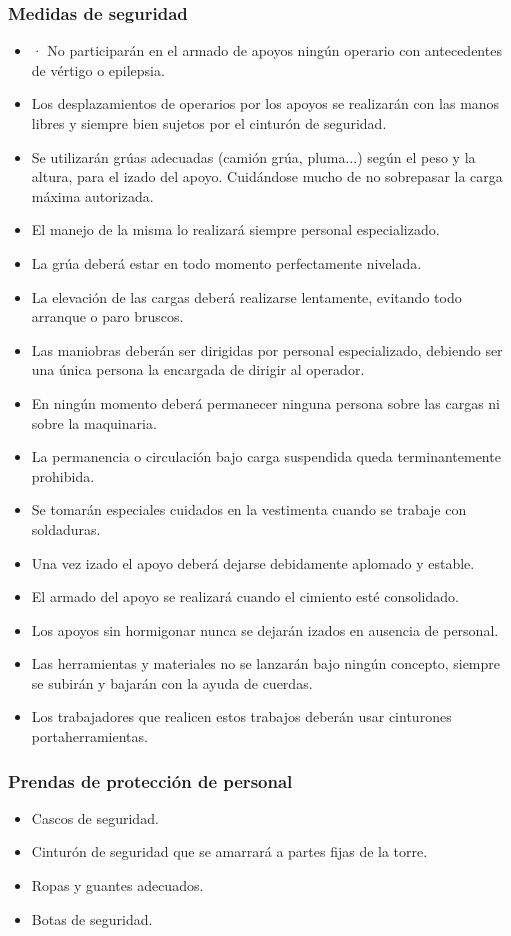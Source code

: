 \subsubsection{Medidas de seguridad}
\label{subsubsec:sysApoyos-MS}
\begin{itemize}
    \item · No participarán en el armado de apoyos ningún operario con antecedentes de vértigo o epilepsia.
    \item Los desplazamientos de operarios por los apoyos se realizarán con las manos libres y siempre bien sujetos por el cinturón de seguridad.
    \item Se utilizarán grúas adecuadas (camión grúa, pluma...) según el peso y la altura, para el izado del apoyo. Cuidándose mucho de no sobrepasar la carga máxima autorizada.
    \item El manejo de la misma lo realizará siempre personal especializado.
    \item La grúa deberá estar en todo momento perfectamente nivelada.
    \item La elevación de las cargas deberá realizarse lentamente, evitando todo arranque o paro bruscos.
    \item Las maniobras deberán ser dirigidas por personal especializado, debiendo ser una única persona la encargada de dirigir al operador.
    \item En ningún momento deberá permanecer ninguna persona sobre las cargas ni sobre la maquinaria.
    \item La permanencia o circulación bajo carga suspendida queda terminantemente prohibida.
    \item Se tomarán especiales cuidados en la vestimenta cuando se trabaje con soldaduras.
    \item Una vez izado el apoyo deberá dejarse debidamente aplomado y estable.
    \item El armado del apoyo se realizará cuando el cimiento esté consolidado.
    \item Los apoyos sin hormigonar nunca se dejarán izados en ausencia de personal.
    \item Las herramientas y materiales no se lanzarán bajo ningún concepto, siempre se subirán y bajarán con la ayuda de cuerdas.
    \item Los trabajadores que realicen estos trabajos deberán usar cinturones portaherramientas.
\end{itemize}
\subsubsection{Prendas de protección de personal}
\label{subsubsec:sysApoyos-EPI}
\begin{itemize}
    \item Cascos de seguridad.
    \item Cinturón de seguridad que se amarrará a partes fijas de la torre.
    \item Ropas y guantes adecuados.
    \item Botas de seguridad.
\end{itemize}
